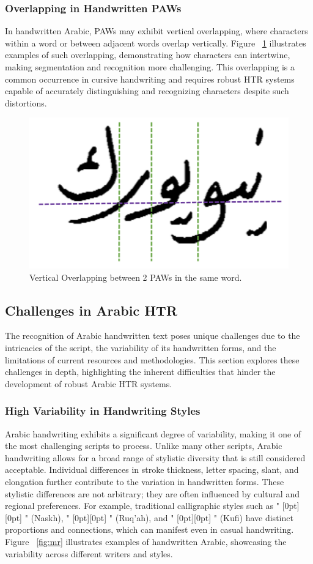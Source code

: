 \documentclass[conference]{IEEEtran}
\newcommand{\artext}[1]{%
  {\fontsize{8pt}{11pt}\selectfont \raisebox{0pt}[0pt][0pt]{\RL{#1}}}%
}
\begin{document}
\subsubsection{Overlapping in Handwritten PAWs}
In handwritten Arabic, PAWs may exhibit vertical overlapping, where characters within a word or between adjacent words overlap vertically. Figure ~\ref{fig:vo} illustrates examples of such overlapping, demonstrating how characters can intertwine, making segmentation and recognition more challenging. This overlapping is a common occurrence in cursive handwriting and requires robust HTR systems capable of accurately distinguishing and recognizing characters despite such distortions.

\begin{figure}[ht]
  \centering
  \includegraphics[width=0.7\linewidth]{Figs/fig3.png}
  \caption{Vertical Overlapping between 2 PAWs in the same word.}
  \label{fig:vo}
\end{figure}


\subsection{Challenges in Arabic HTR}

The recognition of Arabic handwritten text poses unique challenges due to the intricacies of the script, the variability of its handwritten forms, and the limitations of current resources and methodologies. This section explores these challenges in depth, highlighting the inherent difficulties that hinder the development of robust Arabic HTR systems.


\subsubsection{High Variability in Handwriting Styles}

Arabic handwriting exhibits a significant degree of variability, making it one of the most challenging scripts to process. Unlike many other scripts, Arabic handwriting allows for a broad range of stylistic diversity that is still considered acceptable. Individual differences in stroke thickness, letter spacing, slant, and elongation further contribute to the variation in handwritten forms. These stylistic differences are not arbitrary; they are often influenced by cultural and regional preferences. For example, traditional calligraphic styles such as "\artext{النسخ}" (Naskh), "\artext{الرقعة}" (Ruq’ah), and "\artext{الكوفي}" (Kufi) have distinct proportions and connections, which can manifest even in casual handwriting. Figure ~\ref{fig:mr}  illustrates examples of handwritten Arabic, showcasing the variability across different writers and styles.
\end{document}
